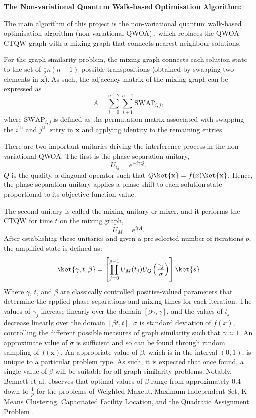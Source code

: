 \textbf{The Non-variational Quantum Walk-based Optimisation Algorithm:}

The main algorithm of this project is the non-variational quantum walk-based optimisation algorithm (non-variational QWOA) \cite{bennett2024nonvariational}, which replaces the QWOA CTQW graph with a mixing graph that connects nearest-neighbour solutions.

For the graph similarity problem, the mixing graph connects each solution state to the set of $\frac{1}{2}n(n-1)$ possible transpositions (obtained by swapping two elements in $\mathbf{x}$). As such, the adjacency matrix of the mixing graph can be expressed as
$$
A = \sum_{i=0}^{n-2} \sum_{i+1}^{n-1} \text{SWAP}_{i,j},
$$
where $\text{SWAP}_{i,j}$ is defined as the permutation matrix associated with swapping the $i^{\text{th}}$ and $j^{\text{th}}$ entry in $\mathbf{x}$ and applying identity to the remaining entries.

There are two important unitaries driving the interference process in the non-variational QWOA. The first is the phase-separation unitary,
$$
U_{Q}=e^{-i\gamma Q}.
$$
$Q$ is the quality, a diagonal operator such that $Q\ket{\mathbf{x}}=f(x)\ket{\mathbf{x}}$. Hence, the phase-separation unitary applies a phase-shift to each solution state proportional to its objective function value. 

The second unitary is called the mixing unitary or mixer, and it performs the CTQW for time $t$ on the mixing graph,
$$
U_{M}= e^{itA}.
$$
After establishing these unitaries and given a pre-selected number of iterations $p$, the amplified state is defined as:
$$
\ket{\gamma,t,\beta}=\left[\prod_{j=0}^{p-1} U_{M}(t_{j}) U_{Q}\left(\frac{\gamma_{j}}{\sigma} \right) \right] \ket{s}
$$
Where $\gamma$, $t$, and $\beta$ are classically controlled positive-valued parameters that determine the applied phase separations and mixing times for each iteration. The values of $\gamma_{j}$ increase linearly over the domain $[\beta \gamma , \gamma]$, and the values of $t_{j}$ decrease linearly over the domain $[\beta t,t]$. $\sigma$ is standard deviation of $f(x)$, controlling the different possible measures of graph similarity such that $\gamma \approx 1$. An approximate value of $\sigma$ is sufficient and so can be found through random sampling of $f(\mathbf{x})$. An appropriate value of $\beta$, which is in the interval $(0,1)$, is unique to a particular problem type. As such, it is expected that once found, a single value of $\beta$ will be suitable for all graph similarity problems. Notably, Bennett et al. observes that optimal values of $\beta$ range from approximately $0.4$ down to $\frac{1}{p}$ for the problems of Weighted Maxcut, Maximum Independent Set, K-Means Clustering, Capacitated Facility Location, and the Quadratic Assignment Problem \cite{bennett2024nonvariational}.

